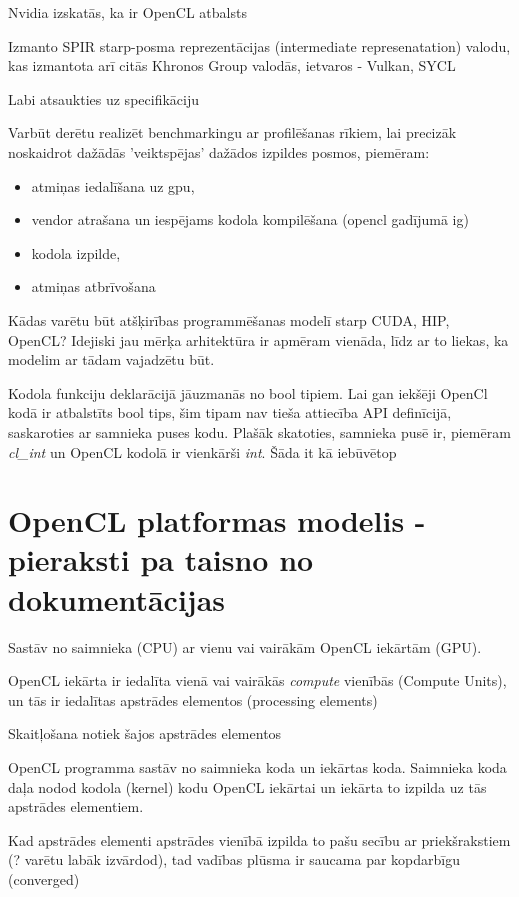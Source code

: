 \documentclass[12pt]{report}%
\theoremstyle{definition}
\begin{document}
Nvidia izskatās, ka ir OpenCL atbalsts

Izmanto SPIR starp-posma reprezentācijas (intermediate represenatation) valodu, kas izmantota arī citās Khronos Group
valodās, ietvaros - Vulkan, SYCL

Labi atsaukties uz specifikāciju \cite{opencl-spec}

Varbūt derētu realizēt benchmarkingu ar profilēšanas rīkiem, lai precizāk noskaidrot dažādās 'veiktspējas'
dažādos izpildes posmos, piemēram:
\begin{itemize}
    \item atmiņas iedalīšana uz gpu,
    \item vendor atrašana un iespējams kodola kompilēšana (opencl gadījumā ig)
    \item kodola izpilde,
    \item atmiņas atbrīvošana
\end{itemize}


Kādas varētu būt atšķirības programmēšanas modelī starp CUDA, HIP, OpenCL? Idejiski jau mērķa arhitektūra ir
apmēram vienāda, līdz ar to liekas, ka modelim ar tādam vajadzētu būt.

Kodola funkciju deklarācijā jāuzmanās no bool tipiem. Lai gan iekšēji OpenCl kodā ir atbalstīts bool tips,
šim tipam nav tieša attiecība API definīcijā, saskaroties ar samnieka puses kodu.
Plašāk skatoties, samnieka pusē ir, piemēram \textit{cl\_int} un OpenCL kodolā ir vienkārši \textit{int}.
Šāda it kā iebūvētop

\section{OpenCL platformas modelis - pieraksti pa taisno no dokumentācijas}
Sastāv no saimnieka (CPU) ar vienu vai vairākām OpenCL iekārtām (GPU).

OpenCL iekārta ir iedalīta vienā vai vairākās \textit{compute} vienībās (Compute Units), un tās ir iedalītas apstrādes elementos (processing elements)

Skaitļošana notiek šajos apstrādes elementos

OpenCL programma sastāv no saimnieka koda un iekārtas koda. 
Saimnieka koda daļa nodod kodola (kernel) kodu OpenCL iekārtai un iekārta to izpilda uz tās apstrādes elementiem.


Kad apstrādes elementi apstrādes vienībā izpilda to pašu secību ar priekšrakstiem (? varētu labāk izvārdod), tad vadības plūsma ir saucama par kopdarbīgu (converged)
\end{document}
